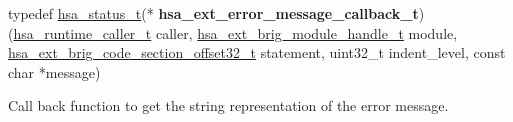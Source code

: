 \documentclass[final]{book}
\begin{document}
\noindent\begin{tcolorbox}[nobeforeafter,arc=0mm,colframe=white,colback=lightgray,left=0mm]
typedef \hyperlink{group__status_1gad755322e7ff95456520e8abdbe90d225}{hsa_status_t}(*  \hypertarget{group__FinalizerCoreApi_1gace3d3971c5289675c4f88ce0045db41f}{\textbf{hsa_ext_error_message_callback_t}})(\hyperlink{group__RuntimeCommon_1ga7d9b1191602415f5dd3893985cc93826}{hsa_runtime_caller_t} caller, \hyperlink{group__FinalizerCoreApi_1ga0216996f5341a8591ecf9e0f6fd1b7e5}{hsa_ext_brig_module_handle_t} module, \hyperlink{group__FinalizerCoreApi_1ga494b8ac14a8c10af95b83b51a8a4ad7f}{hsa_ext_brig_code_section_offset32_t} statement, uint32_t indent_level, const char *message)
\end{tcolorbox}
Call back function to get the string representation of the error message.
\\
\end{document}
